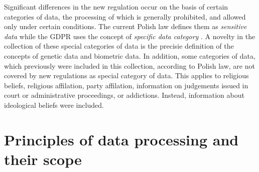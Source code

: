 \documentclass[en, noamssymb]{mgr}
\begin{document}
\indent Significant differences in the new regulation occur on the basis of certain categories of data, the processing of which is generally prohibited, and allowed only under certain conditions. The current Polish law defines them as \textit{sensitive data} \cite{uodo_art27} while the GDPR uses the concept of \textit{specific data category} \cite{rodo_art9}. A novelty in the collection of these special categories of data is the precisie definition of the concepts of genetic data and biometric data. In addition, some categories of data, which previously were included in this collection, according to Polish law, are not covered by new regulations as special category of data. This applies to religious beliefs, religious affilation, party affilation, information on judgements issued in court or administrative proceedings, or addictions.  Instead, information about ideological beliefs were included.

\section{Principles of data processing and their scope} \label{sec:sekcjaZasadyOgolne}
\end{document}
